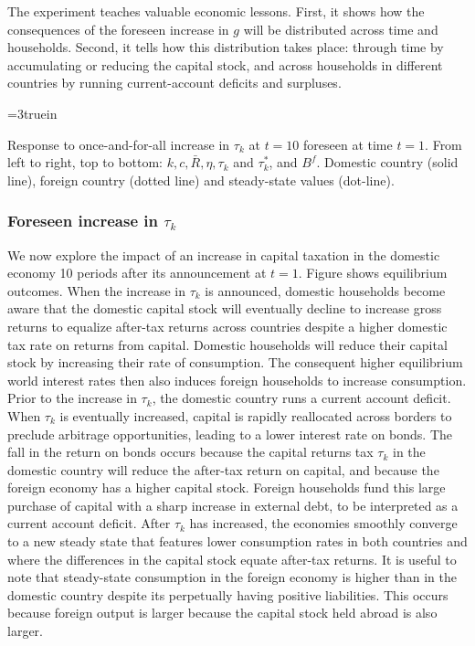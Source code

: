 The experiment teaches  valuable economic lessons. First, it shows how the
consequences of the foreseen increase in $g$ will be distributed across time and households. Second,
it tells how this distribution takes place: through time by accumulating or reducing the
capital stock, and across  households in different countries by running current-account deficits and
surpluses.
\centerline{\epsfxsize=3truein}
\caption{Response to  once-and-for-all increase in $\tau_k$ at $t=10$ foreseen at time $t=1$.
From left to right, top to bottom: $k, c, \bar R, \eta, \tau_k$ and $\tau_k^*$,
and $B^f$.  Domestic country (solid line), foreign country (dotted line) and
steady-state values (dot-line).}
\endfigure


\subsubsection{Foreseen increase in $\tau_k$}
We now explore the impact of an increase in capital taxation in the domestic
economy 10 periods after its announcement at $t=1$. Figure  shows equilibrium outcomes. When the increase
in $\tau_k$ is announced,
domestic households become aware that the domestic capital stock will eventually
decline to increase gross returns to equalize  after-tax
returns across countries despite a higher domestic tax rate on returns from capital.
Domestic households will reduce their
capital stock by increasing their rate of consumption. The consequent higher equilibrium
world interest rates then also induces
foreign households to increase consumption. Prior to the  increase in $\tau_k$, the domestic country runs
a current account deficit. When $\tau_k$ is eventually increased,
 capital is rapidly reallocated across borders to
preclude arbitrage opportunities, leading to a lower interest rate on bonds. The fall in
the return on bonds occurs because the capital returns tax $\tau_k$ in the domestic country will
reduce the after-tax return on capital, and because the foreign economy has
a higher capital stock. Foreign households fund this large purchase of
capital with a sharp increase in external debt, to be interpreted as a current account deficit.
After $\tau_k$ has increased, the economies smoothly converge to a
new steady state that features lower consumption rates in both countries and where
the differences in the capital stock equate after-tax returns. It is useful to
note that steady-state consumption in the foreign economy is higher than in the domestic country despite
its perpetually  having  positive liabilities. This occurs because foreign output is larger because
the capital stock held abroad is also larger.


